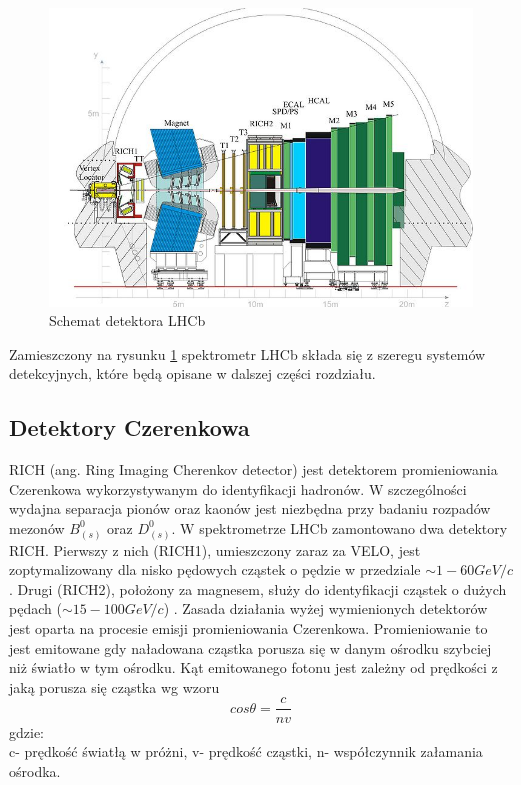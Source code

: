 \begin{figure}[h]
  \centering
  \includegraphics{rozdzial2/Lhcbview.jpg}
  \caption{Schemat detektora LHCb \cite{public}}
  \label{fig:Layout}
\end{figure}

Zamieszczony na rysunku \ref{fig:Layout} spektrometr LHCb składa się z szeregu systemów detekcyjnych, które będą opisane w dalszej części rozdziału. 

\subsection{Detektory Czerenkowa}
RICH (ang. Ring Imaging Cherenkov detector) jest detektorem promieniowania Czerenkowa wykorzystywanym do identyfikacji hadronów. W szczególności wydajna separacja pionów oraz kaonów jest niezbędna przy badaniu rozpadów mezonów $B_{(s)}^0$ oraz $D_{(s)}^0$. W spektrometrze LHCb zamontowano dwa detektory RICH. Pierwszy z nich (RICH1), umieszczony zaraz za VELO, jest zoptymalizowany dla nisko pędowych cząstek o pędzie w przedziale $\sim 1- 60 GeV/c$. Drugi (RICH2), położony za magnesem, służy do identyfikacji cząstek o dużych pędach ($\sim 15-100 GeV/c$) \cite{RICH}. Zasada działania wyżej wymienionych detektorów jest oparta na procesie emisji promieniowania Czerenkowa. Promieniowanie to jest emitowane gdy naładowana cząstka porusza się w danym ośrodku szybciej niż światło w tym ośrodku. Kąt emitowanego fotonu jest zależny od prędkości z jaką porusza się cząstka wg wzoru
\begin{equation}
 cos\theta=\frac{c}{n v}
\end{equation}
gdzie:\\
c- prędkość światłą w próżni, v- prędkość cząstki, n- współczynnik załamania ośrodka.
